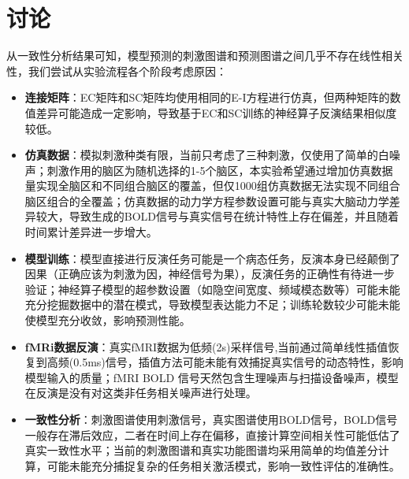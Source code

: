 \documentclass[12pt,a4paper]{article}
\begin{document}
\section{讨论}
从一致性分析结果可知，模型预测的刺激图谱和预测图谱之间几乎不存在线性相关性，我们尝试从实验流程各个阶段考虑原因：
\begin{itemize}
    \item \textbf{连接矩阵}：EC矩阵和SC矩阵均使用相同的E-I方程进行仿真，但两种矩阵的数值差异可能造成一定影响，导致基于EC和SC训练的神经算子反演结果相似度较低。
    \item \textbf{仿真数据}：模拟刺激种类有限，当前只考虑了三种刺激，仅使用了简单的白噪声；刺激作用的脑区为随机选择的1-5个脑区，本实验希望通过增加仿真数据量实现全脑区和不同组合脑区的覆盖，但仅1000组仿真数据无法实现不同组合脑区组合的全覆盖；仿真数据的动力学方程参数设置可能与真实大脑动力学差异较大，导致生成的BOLD信号与真实信号在统计特性上存在偏差，并且随着时间累计差异进一步增大。
    \item \textbf{模型训练}：模型直接进行反演任务可能是一个病态任务，反演本身已经颠倒了因果（正确应该为刺激为因，神经信号为果），反演任务的正确性有待进一步验证；神经算子模型的超参数设置（如隐空间宽度、频域模态数等）可能未能充分挖掘数据中的潜在模式，导致模型表达能力不足；训练轮数较少可能未能使模型充分收敛，影响预测性能。
    \item \textbf{fMRi数据反演}：真实fMRI数据为低频(2s)采样信号,当前通过简单线性插值恢复到高频(0.5ms)信号，插值方法可能未能有效捕捉真实信号的动态特性，影响模型输入的质量；fMRI BOLD 信号天然包含生理噪声与扫描设备噪声，模型在反演是没有对这类非任务相关噪声进行处理。
    \item \textbf{一致性分析}：刺激图谱使用刺激信号，真实图谱使用BOLD信号，BOLD信号一般存在滞后效应，二者在时间上存在偏移，直接计算空间相关性可能低估了真实一致性水平；当前的刺激图谱和真实功能图谱均采用简单的均值差分计算，可能未能充分捕捉复杂的任务相关激活模式，影响一致性评估的准确性。
\end{itemize}
\end{document}
